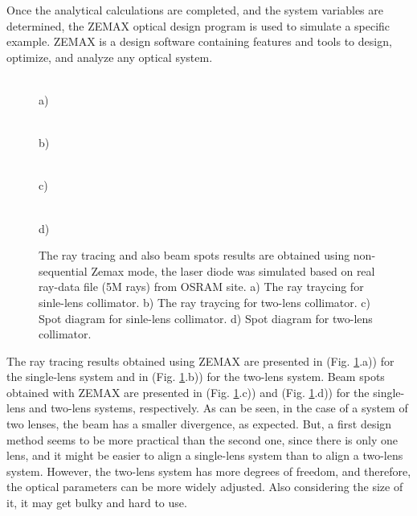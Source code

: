 Once the analytical calculations are completed, and the system variables are determined, the ZEMAX optical design program is used to simulate a specific example.
ZEMAX is a design software containing features and tools to design, optimize, and analyze any optical system.



\begin{figure}[H]
\begin{minipage}[h]{0.48\linewidth}
\\ a)
\end{minipage}
\hfill
\begin{minipage}[h]{0.45\linewidth}
\\ b)
\end{minipage}
\vfill
\begin{minipage}[h]{0.495\linewidth}
 \\ c)
\end{minipage}
\hfill
\begin{minipage}[h]{0.495\linewidth}
 \\ d)
\end{minipage}

\caption{The ray tracing and  also beam spots results are obtained using non-sequential Zemax mode, the laser diode was simulated based on real ray-data file (5M rays) from OSRAM site.
a) The ray traycing for sinle-lens collimator.
b) The ray traycing for two-lens collimator.
c) Spot diagram for sinle-lens collimator.
d) Spot diagram for two-lens collimator.
}
\label{fig:spot_simulation}
\end{figure}





The ray tracing results obtained using ZEMAX are presented in (Fig. \ref{fig:spot_simulation}.a)) for the single-lens system and in (Fig. \ref{fig:spot_simulation}.b)) for the two-lens system.
Beam spots obtained with ZEMAX are presented in (Fig. \ref{fig:spot_simulation}.c)) and (Fig. \ref{fig:spot_simulation}.d)) for the single-lens and two-lens systems, respectively. 
As can be seen, in the case of a system of two lenses, the beam has a smaller divergence, as expected.
But, a first design method seems to be more practical than the second one, since there is only
one lens, and it might be easier to align a single-lens system than to align a two-lens system.
However, the two-lens system has more degrees of freedom, and therefore, the optical
parameters can be more widely adjusted.
Also considering the size of it, it may get bulky and hard to use.

